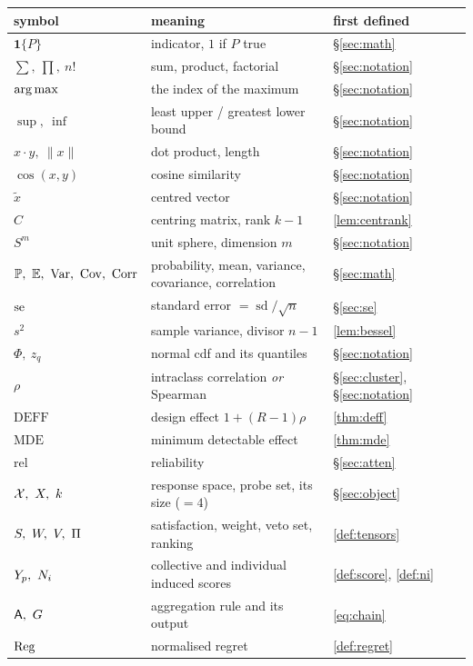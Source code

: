 \begin{table}[H]\centering\footnotesize
\begin{tabular}{llll}
\toprule
symbol & meaning & first defined & \\
\midrule
$\mathbf{1}\{P\}$ & indicator, $1$ if $P$ true & §\ref{sec:math} &\\
$\sum,\ \prod,\ n!$ & sum, product, factorial & §\ref{sec:notation} &\\
$\operatorname*{arg\,max}$ & the index of the maximum & §\ref{sec:notation} &\\
$\sup,\ \inf$ & least upper / greatest lower bound & §\ref{sec:notation} &\\
$x\cdot y,\ \|x\|$ & dot product, length & §\ref{sec:notation} &\\
$\cos(x,y)$ & cosine similarity & §\ref{sec:notation} &\\
$\tilde x$ & centred vector & §\ref{sec:notation} &\\
$C$ & centring matrix, rank $k-1$ & \cref{lem:centrank} &\\
$S^{m}$ & unit sphere, dimension $m$ & §\ref{sec:notation} &\\
$\Prob,\ \E,\ \Var,\ \Cov,\ \Corr$ & probability, mean, variance, covariance, correlation & §\ref{sec:math} &\\
$\operatorname{se}$ & standard error $=\operatorname{sd}/\sqrt n$ & §\ref{sec:se} &\\
$s^2$ & sample variance, divisor $n-1$ & \cref{lem:bessel} &\\
$\Phi,\ z_q$ & normal cdf and its quantiles & §\ref{sec:notation} &\\
$\rho$ & intraclass correlation \emph{or} Spearman & §\ref{sec:cluster}, §\ref{sec:notation} &\\
$\mathrm{DEFF}$ & design effect $1+(R-1)\rho$ & \cref{thm:deff} &\\
$\mathrm{MDE}$ & minimum detectable effect & \cref{thm:mde} &\\
$\mathrm{rel}$ & reliability & §\ref{sec:atten} &\\
$\resp,\ X,\ k$ & response space, probe set, its size ($=4$) & §\ref{sec:object} &\\
$\sat,\ \wt,\ V,\ \Pi$ & satisfaction, weight, veto set, ranking & \cref{def:tensors} &\\
$Y_p,\ \Nn_i$ & collective and individual induced scores & \cref{def:score}, \cref{def:ni} &\\
$\Agg,\ G$ & aggregation rule and its output & \cref{eq:chain} &\\
$\mathrm{Reg}$ & normalised regret & \cref{def:regret} &\\

\end{tabular}
\end{table}
